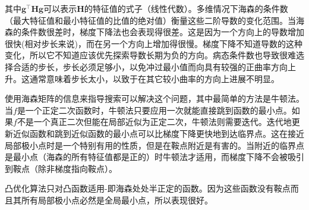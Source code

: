             其中$\bm{g}^\top \bm{Hg}$可以表示$\bm{H}$的特征值的式子（线性代数）。多维情况下海森的条件数（最大特征值和最小特征值的比值的绝对值）衡量这些二阶导数的变化范围。当海森的条件数很差时，梯度下降法也会表现得很差。这是因为一个方向上的导数增加很快(相对步长来说)，而在另一个方向上增加得很慢。梯度下降不知道导数的这种变化，所以它不知道应该优先探索导数长期为负的方向。病态条件数也导致很难选择合适的步长，步长必须足够小，以免冲过最小值而向具有较强的正曲率方向上升。这通常意味着步长太小，以致于在其它较小曲率的方向上进展不明显。
            
            使用海森矩阵的信息来指导搜索可以解决这个问题，其中最简单的方法是牛顿法。当$f$是一个正定二次函数时，牛顿法只要应用一次就能直接跳到函数的最小点。如果$f$不是一个真正二次但能在局部近似为正定二次，牛顿法则需要迭代。迭代地更新近似函数和跳到近似函数的最小点可以比梯度下降更快地到达临界点。这在接近局部极小点时是一个特别有用的性质，但是在鞍点附近是有害的。当附近的临界点是最小点（海森的所有特征值都是正的）时牛顿法才适用，而梯度下降不会被吸引到鞍点（除非梯度指向鞍点）。
            
            凸优化算法只对凸函数适用-即海森处处半正定的函数。因为这些函数没有鞍点而且其所有局部极小点必然是全局最小点，所以表现很好。


